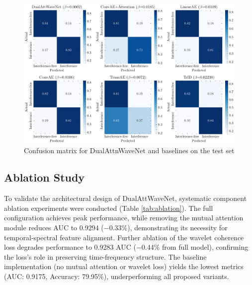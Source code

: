 \documentclass[10pt, conference]{IEEEtran}
\begin{document}
\begin{figure}[tb]
    \centering
    \includegraphics[width=\linewidth]{confusion.pdf}
    \caption{Confusion matrix for DualAttnWaveNet and baselines on the test set}
    \label{fig:confusion_matrix}
\end{figure}


\subsection{Ablation Study}

To validate the architectural design of DualAttWaveNet, systematic component ablation experiments were conducted (Table \ref{tab:ablation}). The full configuration achieves peak performance, while removing the mutual attention module reduces AUC to 0.9294 (−0.33\%), demonstrating its necessity for temporal-spectral feature alignment. Further ablation of the wavelet coherence loss degrades performance to 0.9283 AUC (−0.44\% from full model), confirming the loss’s role in preserving time-frequency structure. The baseline implementation (no mutual attention or wavelet loss) yields the lowest metrics (AUC: 0.9175, Accuracy: 79.95\%), underperforming all proposed variants.
\end{document}
